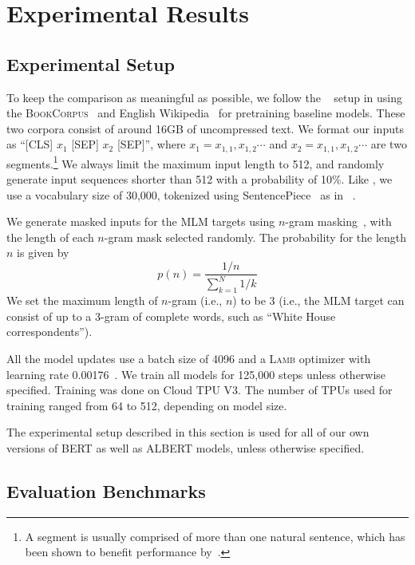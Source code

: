 \section{Experimental Results}

\subsection{Experimental Setup}
\label{sec:setup}
To keep the comparison as meaningful as possible, we follow the \bert~\citep{devlin2018bert} setup in using the \textsc{BookCorpus}~\citep{zhu2015aligning} and English Wikipedia~\citep{devlin2018bert} for pretraining baseline models.
These two corpora consist of around 16GB of uncompressed text.
We format our inputs as ``\textsc{[CLS]} $x_1$ \textsc{[SEP]} $x_2$ \textsc{[SEP]}'', where $x_1=x_{1,1},x_{1,2}\cdots$ and $x_2=x_{1,1},x_{1,2}\cdots$ are two segments.\footnote{A segment is usually comprised of more than one natural sentence, which has been shown to benefit performance by~\cite{liu2019roberta}.} 
We always limit the maximum input length to 512, and randomly generate input sequences shorter than 512 with a probability of 10\%.
Like \bert, we use a vocabulary size of 30,000, tokenized using SentencePiece~\citep{kudo-richardson-2018-sentencepiece} as in \xlnet~\citep{yang2019xlnet}.

We generate masked inputs for the MLM targets using $n$-gram masking~\citep{joshi2019spanbert}, with the length of each $n$-gram mask selected randomly.
The probability for the length $n$ is given by
$$
    p(n) = \frac{1/n}{\sum_{k=1}^N{1/k}}
$$
We set the maximum length of $n$-gram (i.e., $n$) to be 3 (i.e., the MLM target can consist of up to a 3-gram of complete words, such as ``White House correspondents'').

All the model updates use a batch size of 4096 and a \textsc{Lamb} optimizer with learning rate 0.00176~\citep{you2019reducing}.
We train all models for 125,000 steps unless otherwise specified.
Training was done on Cloud TPU V3.
The number of TPUs used for training ranged from 64 to 512, depending on model size. 

The experimental setup described in this section is used for all of our own versions of BERT as well as ALBERT models, unless otherwise specified. 


\subsection{Evaluation Benchmarks}


